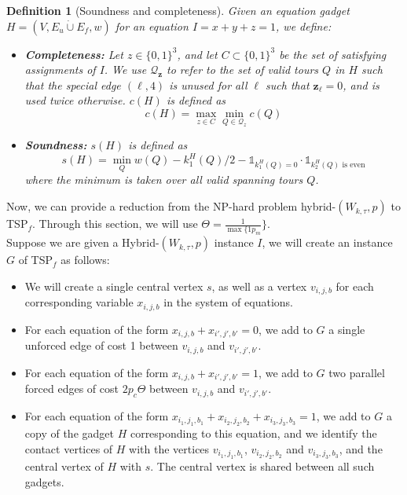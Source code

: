 \documentclass[12pt]{article}
\newtheorem{definition}{Definition}
\begin{document}
\begin{definition}[Soundness and completeness] Given an equation gadget $H = (V, E_u   \dot\cup E_f, w)$ for an equation $I=x+y+z=1$, we define:
\begin{itemize}
    \item \textbf{Completeness:} Let $z\in {\{0,1\}}^3$, and let $C\subset {\{0,1\}}^3$ be the set of satisfying assignments of $I$. We use $\mathcal{Q}_{\mathbf{z}}$ to refer to the set of valid tours $Q$ in $H$ such that the special edge $(\ell, 4)$ is unused for all $\ell$ such that $\mathbf{z}_\ell = 0$, and is used twice otherwise. $c{(H)}$ is defined as
    \[
    c(H) = \max_{z \in C} \min_{Q \in \mathcal{Q}_{z}} c(Q)
    \]
    \item \textbf{Soundness:} $s(H)$ is defined as
    \[
    s(H) = \min_{Q} w(Q) - k_1^H(Q)/2 - \mathds{1}_{ {k_1^H(Q) = 0} } \cdot \mathds{1}_{ {k_2^H(Q) \text{ is even}} }
    \]
    where the minimum is taken over all valid spanning tours $Q$.
\end{itemize}
\end{definition}
Now, we can provide a reduction from the NP-hard problem hybrid-$(W_{k,\tau},p)$ to TSP$_f$. Through this section, we will use $\Theta=\frac{1}{\max\{{1}{p_m}}\}$. 
\\
Suppose we are given a Hybrid-$(W_{k,\tau},p)$ instance $I$, we will create an instance $G$ of TSP$_f$ as follows:
\begin{itemize}
    \item We will create a single central vertex $s$, as well as a vertex $v_{i,j,b}$ for each corresponding variable $x_{i,j,b}$ in the system of equations.
    \item For each equation of the form $x_{i,j,b}+x_{i',j',b'}=0$, we add to $G$ a single unforced edge of cost 1 between $v_{i,j,b}$ and $v_{i',j',b'}$.
    \item For each equation of the form $x_{i,j,b}+x_{i',j',b'}=1$, we add to $G$ two parallel forced edges of cost $2p_c\Theta$ between $v_{i,j,b}$ and $v_{i',j',b'}$.
    \item For each equation of the form $x_{i_1,j_1,b_1}+x_{i_2,j_2,b_2}+x_{i_3,j_3,b_3}=1$, we add to $G$ a copy of the gadget $H$ corresponding to this equation, and we identify the contact vertices of $H$ with the vertices $v_{i_1,j_1,b_1}$, $v_{i_2,j_2,b_2}$ and $v_{i_3,j_3,b_3}$, and the central vertex of $H$ with $s$. The central vertex is shared between all such gadgets. 
\end{itemize}
\end{document}
